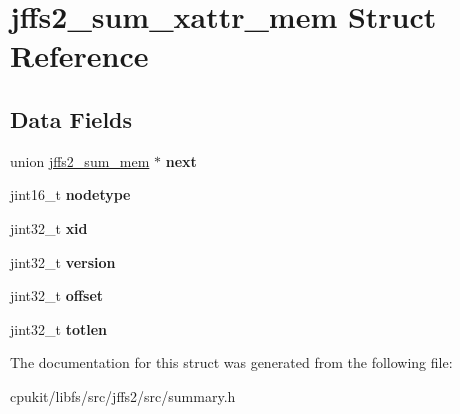 \hypertarget{structjffs2__sum__xattr__mem}{}\section{jffs2\+\_\+sum\+\_\+xattr\+\_\+mem Struct Reference}
\label{structjffs2__sum__xattr__mem}
\subsection*{Data Fields}
\begin{DoxyCompactItemize}
\item 
\mbox{\label{structjffs2__sum__xattr__mem_a6a5bc5c399537c5954ed0cd7ef439cbc}} 
union \mbox{\hyperlink{unionjffs2__sum__mem}{jffs2\+\_\+sum\+\_\+mem}} $\ast$ {\bfseries next}
\item 
\mbox{\label{structjffs2__sum__xattr__mem_a33dff6053ca1b4b10d3995306aec6b17}} 
jint16\+\_\+t {\bfseries nodetype}
\item 
\mbox{\label{structjffs2__sum__xattr__mem_ab240a59e6aab78c68b98be4a58ef139b}} 
jint32\+\_\+t {\bfseries xid}
\item 
\mbox{\label{structjffs2__sum__xattr__mem_a6c3b02ee2d9a905484d560be11b5d37f}} 
jint32\+\_\+t {\bfseries version}
\item 
\mbox{\label{structjffs2__sum__xattr__mem_a1f4c82ab1a726b669e62982237358afd}} 
jint32\+\_\+t {\bfseries offset}
\item 
\mbox{\label{structjffs2__sum__xattr__mem_af6f530603834e553972283f3f11d0d1f}} 
jint32\+\_\+t {\bfseries totlen}
\end{DoxyCompactItemize}


The documentation for this struct was generated from the following file\+:\begin{DoxyCompactItemize}
\item 
cpukit/libfs/src/jffs2/src/summary.\+h\end{DoxyCompactItemize}
